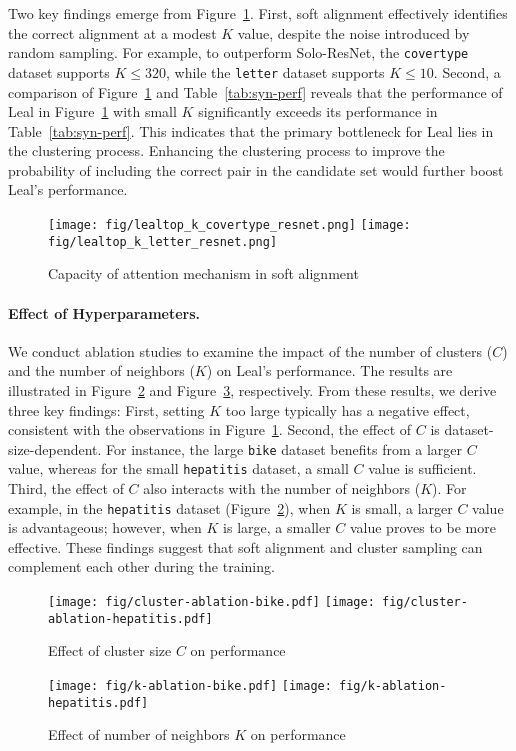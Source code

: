 Two key findings emerge from Figure~\ref{fig:lealtop}. First, soft alignment effectively identifies the correct alignment at a modest $K$ value, despite the noise introduced by random sampling. For example, to outperform Solo-ResNet, the \texttt{covertype} dataset supports $K \leq 320$, while the \texttt{letter} dataset supports $K \leq 10$. Second, a comparison of Figure~\ref{fig:lealtop} and Table~\ref{tab:syn-perf} reveals that the performance of Leal in Figure~\ref{fig:lealtop} with small $K$ significantly exceeds its performance in Table~\ref{tab:syn-perf}. This indicates that the primary bottleneck for Leal lies in the clustering process. Enhancing the clustering process to improve the probability of including the correct pair in the candidate set would further boost Leal’s performance.


\begin{figure}[ht]
    \centering
    \texttt{[image: fig/lealtop\_k\_covertype\_resnet.png]}
    \texttt{[image: fig/lealtop\_k\_letter\_resnet.png]}
    \caption{Capacity of attention mechanism in soft alignment}
    \label{fig:lealtop}
\end{figure}


\paragraph{Effect of Hyperparameters.}
We conduct ablation studies to examine the impact of the number of clusters ($C$) and the number of neighbors ($K$) on Leal's performance. The results are illustrated in Figure~\ref{fig:ablation-C} and Figure~\ref{fig:ablation-K}, respectively. From these results, we derive three key findings: First, setting $K$ too large typically has a negative effect, consistent with the observations in Figure~\ref{fig:lealtop}. Second, the effect of $C$ is dataset-size-dependent. For instance, the large \texttt{bike} dataset benefits from a larger $C$ value, whereas for the small \texttt{hepatitis} dataset, a small $C$ value is sufficient. Third, the effect of $C$ also interacts with the number of neighbors ($K$). For example, in the \texttt{hepatitis} dataset (Figure~\ref{fig:ablation-C}), when $K$ is small, a larger $C$ value is advantageous; however, when $K$ is large, a smaller $C$ value proves to be more effective. These findings suggest that soft alignment and cluster sampling can complement each other during the training.


\begin{figure}
  \centering
  \texttt{[image: fig/cluster-ablation-bike.pdf]}
  \texttt{[image: fig/cluster-ablation-hepatitis.pdf]}
  \caption{Effect of cluster size $C$ on performance}
  \label{fig:ablation-C}
\end{figure}

\begin{figure}
  \centering
  \texttt{[image: fig/k-ablation-bike.pdf]}
  \texttt{[image: fig/k-ablation-hepatitis.pdf]}
  \caption{Effect of number of neighbors $K$ on performance}
  \label{fig:ablation-K}
\end{figure}
